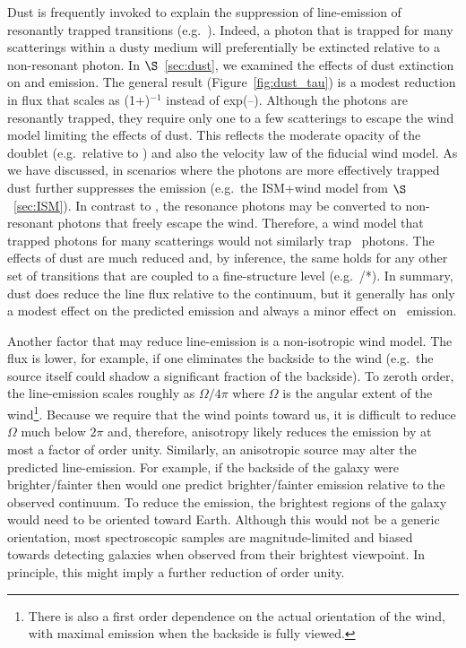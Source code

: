 \documentclass[12pt,preprint]{aastex}
\begin{document}
Dust is frequently invoked to explain the suppression of line-emission
of resonantly trapped transitions (e.g.\ \lya).  Indeed, a photon
that is trapped for many scatterings within a dusty medium will 
preferentially be extincted relative to a non-resonant photon.  In
$\S$~\ref{sec:dust}, we examined the effects of dust extinction on 
 and  emission.  The general result
(Figure~\ref{fig:dust_tau}) is a modest
reduction in flux that scales as (1+\taud)$^{-1}$ instead of
exp(--\taud). Although the  photons are resonantly
trapped, they require only one to a few scatterings
to escape the wind model limiting the effects of
dust.  This reflects the moderate opacity of the 
doublet (e.g.\ relative to \lya) and also the velocity law of the
fiducial wind model.
As we have discussed, in scenarios where the  photons are
more effectively trapped dust further suppresses
the emission (e.g.\ the ISM+wind model from $\S$~\ref{sec:ISM}).
In contrast to , 
the  resonance photons may be
converted to non-resonant photons that freely escape the wind.
Therefore, a wind model that trapped 
photons for many scatterings would not similarly trap 
\feiid\ photons.  The effects of dust are much 
reduced and, by inference, the same holds for any other set of
transitions that are coupled to a fine-structure level (e.g.\
/*).  In summary,
dust does reduce the line flux relative to the continuum, but 
it generally has only a modest effect on the predicted 
emission and always a minor effect on \feiis\ emission.

Another factor that may reduce line-emission is a
non-isotropic wind model. The flux is lower, for example, if one
eliminates the backside to the wind (e.g.\ the source itself could
shadow a significant fraction of the backside).  To zeroth order, the
line-emission scales 
roughly as $\Omega/4\pi$ where $\Omega$ is the angular extent of the
wind\footnote{There is also a first order dependence on the actual
  orientation of the wind, with maximal emission when the backside is
  fully viewed.}.  Because we require that the wind 
points toward us, it is difficult to reduce $\Omega$ much
below $2 \pi$ and, therefore, anisotropy likely reduces the
emission by at most a factor of order unity.  
Similarly, an anisotropic source may alter the predicted
line-emission.  For example, if the backside of the galaxy were
brighter/fainter then would one predict brighter/fainter emission
relative to the observed continuum.
To reduce the emission, the brightest regions
of the galaxy would need to be oriented toward Earth.  Although this
would not be a
generic orientation, most spectroscopic samples are magnitude-limited
and biased towards detecting galaxies when observed from their
brightest viewpoint.  In principle, this might imply a further
reduction of order unity.
\end{document}
